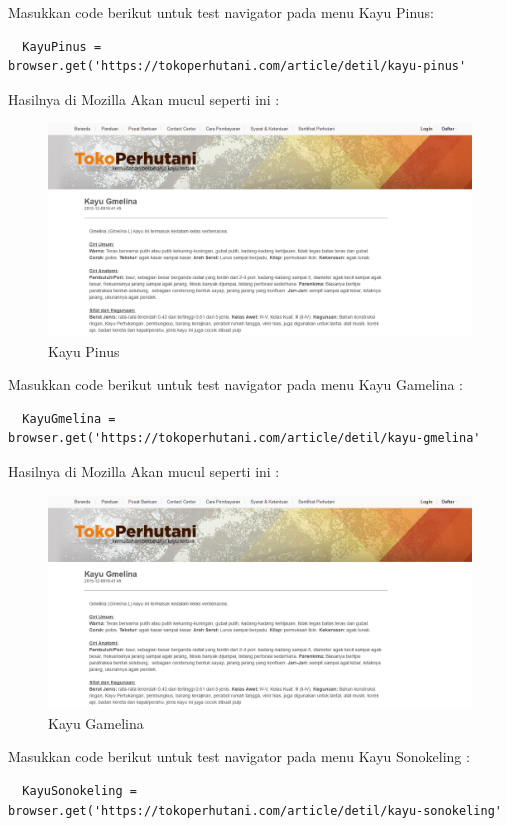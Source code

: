 Masukkan code berikut untuk test navigator pada menu Kayu Pinus:

\begin{verbatim}
  KayuPinus = browser.get('https://tokoperhutani.com/article/detil/kayu-pinus'
\end{verbatim}

Hasilnya  di Mozilla Akan mucul seperti ini :
\begin{figure}[h]
\centering
\includegraphics[scale=0.3]{figures/aa}
\caption{Kayu Pinus}
\end{figure}

Masukkan code berikut untuk test navigator pada menu Kayu Gamelina :
\begin{verbatim}
  KayuGmelina = browser.get('https://tokoperhutani.com/article/detil/kayu-gmelina'
\end{verbatim}

Hasilnya  di Mozilla Akan mucul seperti ini :
\begin{figure}[h]
\centering
\includegraphics[scale=0.3]{figures/2kg}
\caption{Kayu Gamelina}
\end{figure}

Masukkan code berikut untuk test navigator pada menu Kayu Sonokeling :
\begin{verbatim}
  KayuSonokeling = browser.get('https://tokoperhutani.com/article/detil/kayu-sonokeling'
\end{verbatim}

